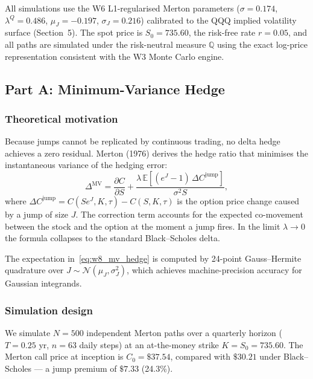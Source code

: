 \documentclass[12pt]{article}
\begin{document}
All simulations use the W6 L1-regularised Merton parameters
($\sigma = 0.174$, $\lambda^Q = 0.486$, $\mu_J = -0.197$,
$\sigma_J = 0.216$) calibrated to the QQQ implied volatility surface
(Section~5). The spot price is $S_0 = 735.60$, the risk-free rate
$r = 0.05$, and all paths are simulated under the risk-neutral measure
$\mathbb{Q}$ using the exact log-price representation consistent with
the W3 Monte Carlo engine.

\subsection*{Part A: Minimum-Variance Hedge}

\subsubsection*{Theoretical motivation}

Because jumps cannot be replicated by continuous trading, no delta hedge
achieves a zero residual. Merton (1976) derives the hedge ratio that
minimises the instantaneous variance of the hedging error:
\begin{equation}
  \Delta^{\mathrm{MV}} = \frac{\partial C}{\partial S}
  + \frac{\lambda\,\mathbb{E}\!\left[(e^{J}-1)\,\Delta C^{\mathrm{jump}}\right]}
         {\sigma^{2} S},
  \label{eq:w8_mv_hedge}
\end{equation}
where $\Delta C^{\mathrm{jump}} = C(Se^{J},K,\tau) - C(S,K,\tau)$ is the
option price change caused by a jump of size $J$.
The correction term accounts for the expected co-movement between the
stock and the option at the moment a jump fires.
In the limit $\lambda \to 0$ the formula collapses to the standard
Black--Scholes delta.

The expectation in~\eqref{eq:w8_mv_hedge} is computed by
24-point Gauss--Hermite quadrature over $J \sim \mathcal{N}(\mu_J,\sigma_J^2)$,
which achieves machine-precision accuracy for Gaussian integrands.

\subsubsection*{Simulation design}

We simulate $N = 500$ independent Merton paths over a quarterly horizon
($T = 0.25$ yr, $n = 63$ daily steps) at an at-the-money strike
$K = S_0 = 735.60$.
The Merton call price at inception is $C_0 = \$37.54$, compared with
$\$30.21$ under Black--Scholes — a jump premium of $\$7.33$ (24.3\%).
\end{document}
